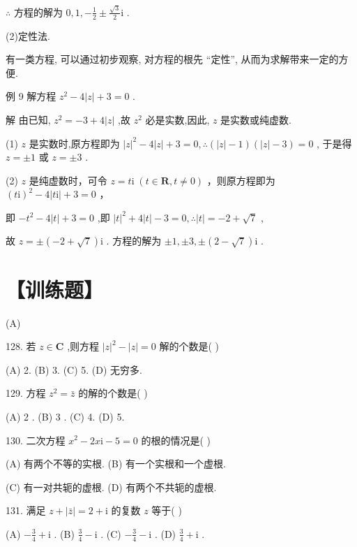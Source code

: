\documentclass[10pt]{article}
\begin{document}
\(\therefore\) 方程的解为 \(0,1, - \frac{1}{2} \pm  \frac{\sqrt{3}}{2}\mathrm{i}\) .

(2)定性法.

有一类方程, 可以通过初步观察, 对方程的根先 “定性”, 从而为求解带来一定的方便.

例 9 解方程 \({z}^{2} - 4\left| z\right|  + 3 = 0\) .

解 由已知, \({z}^{2} =  - 3 + 4\left| z\right|\) ,故 \({z}^{2}\) 必是实数,因此, \(z\) 是实数或纯虚数.

(1) \(z\) 是实数时,原方程即为 \({\left| z\right| }^{2} - 4\left| z\right|  + 3 = 0,\therefore \left( {\left| z\right|  - 1}\right) \left( {\left| z\right|  - 3}\right)  = 0\) , 于是得 \(z =  \pm  1\) 或 \(z =  \pm  3\) .

(2) \(z\) 是纯虚数时，可令 \(z = t\mathrm{i}\;\left( {t \in  \mathbf{R},t \neq  0}\right)\) ，则原方程即为 \({\left( t\mathrm{i}\right) }^{2} - 4\left| {t\mathrm{i}}\right|  + 3 = 0\) ，

即 \(- {t}^{2} - 4\left| t\right|  + 3 = 0\) ,即 \({\left| t\right| }^{2} + 4\left| t\right|  - 3 = 0,\therefore \left| t\right|  =  - 2 + \sqrt{7}\) ,

故 \(z =  \pm  \left( {-2 + \sqrt{7}}\right) \mathrm{i}\) . 方程的解为 \(\pm  1, \pm  3, \pm  \left( {2 - \sqrt{7}}\right) \mathrm{i}\) .

\section*{【训练题】}

(A)

128. 若 \(z \in  \mathbf{C}\) ,则方程 \({\left| z\right| }^{2} - \left| z\right|  = 0\) 解的个数是( )

(A) 2. (B) 3. (C) 5. (D) 无穷多.

129. 方程 \({z}^{2} = \bar{z}\) 的解的个数是( )

(A) 2 . (B) 3 . (C) 4. (D) 5.

130. 二次方程 \({x}^{2} - {2x}\mathrm{i} - 5 = 0\) 的根的情况是( )

(A) 有两个不等的实根. (B) 有一个实根和一个虚根.

(C) 有一对共轭的虚根. (D) 有两个不共轭的虚根.

131. 满足 \(z + \left| \bar{z}\right|  = 2 + \mathrm{i}\) 的复数 \(z\) 等于( )

(A) \(- \frac{3}{4} + \mathrm{i}\) . (B) \(\frac{3}{4} - \mathrm{i}\) . (C) \(- \frac{3}{4} - \mathrm{i}\) . (D) \(\frac{3}{4} + \mathrm{i}\) .
\end{document}
